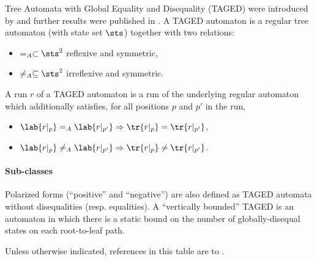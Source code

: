 Tree Automata with Global Equality and Disequality (TAGED) were introduced
by \cite{filiot:sltv} and further results were published in
\cite{filiot:tagc}.  A TAGED automaton is a regular tree automaton (with
state set $\sts$) together with two relations:
\begin{itemize}
  \item $=_A \subset \sts^2$ reflexive and symmetric,
  \item $\neq_A \subseteq \sts^2$ irreflexive and symmetric.
\end{itemize}
A run $r$ of a TAGED automaton is a run of the underlying regular automaton
which additionally satisfies, for all positions $p$ and $p'$ in the run,
\begin{itemize}
  \item $\lab{r|_p} =_A    \lab{r|_{p'}} \Rightarrow \tr{r|_p} = \tr{r|_{p'}}$,
  \item $\lab{r|_p} \neq_A \lab{r|_{p'}} \Rightarrow \tr{r|_p} \neq \tr{r|_{p'}}$.
\end{itemize}

\paragraph{Sub-classes} Polarized forms (``positive'' and ``negative'') are
also defined as TAGED automata without disequalities (resp. equalities).  A
``vertically bounded'' TAGED is an automaton in which there is a static
bound on the number of globally-disequal states on each root-to-leaf path. 

Unless otherwise indicated, references in this table are to
\cite{filiot:tagc}.
